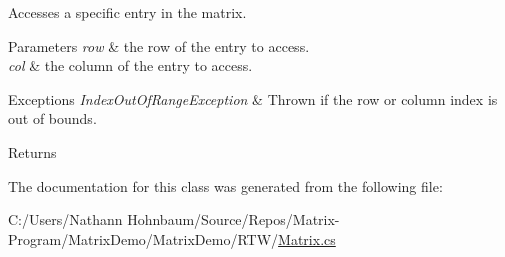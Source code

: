 Accesses a specific entry in the matrix. 


\begin{DoxyParams}{Parameters}
{\em row} & the row of the entry to access.\\
\hline
{\em col} & the column of the entry to access.\\
\hline
\end{DoxyParams}

\begin{DoxyExceptions}{Exceptions}
{\em Index\+Out\+Of\+Range\+Exception} & Thrown if the row or column index is out of bounds.\\
\hline
\end{DoxyExceptions}
\begin{DoxyReturn}{Returns}

\end{DoxyReturn}


The documentation for this class was generated from the following file\+:\begin{DoxyCompactItemize}
\item 
C\+:/\+Users/\+Nathann Hohnbaum/\+Source/\+Repos/\+Matrix-\/\+Program/\+Matrix\+Demo/\+Matrix\+Demo/\+R\+T\+W/\mbox{\hyperlink{_matrix_8cs}{Matrix.\+cs}}\end{DoxyCompactItemize}
